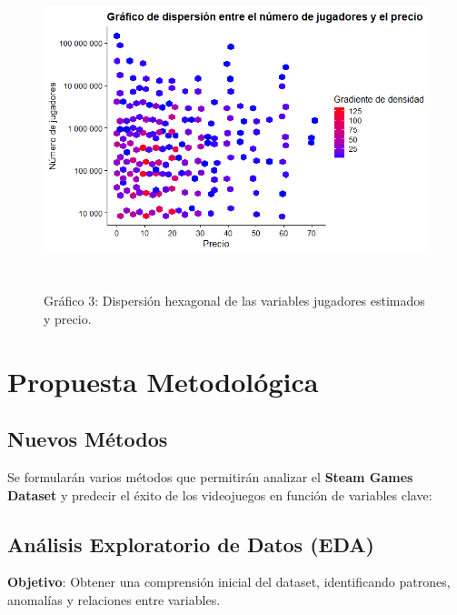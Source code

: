 \documentclass[
  letterpaper,
  DIV=11,
  numbers=noendperiod]{scrreprt}
\begin{document}
\begin{figure}

{\centering \includegraphics[width=138mm,height=92mm]{./imagenes/Rplot02.png}

}

\caption{Gráfico 3: Dispersión hexagonal de las variables jugadores
estimados y precio.}

\end{figure}

\hypertarget{propuesta-metodoluxf3gica}{%
\section{Propuesta Metodológica}\label{propuesta-metodoluxf3gica}}

\hypertarget{nuevos-muxe9todos}{%
\subsection{Nuevos Métodos}\label{nuevos-muxe9todos}}

Se formularán varios métodos que permitirán analizar el \textbf{Steam
Games Dataset} y predecir el éxito de los videojuegos en función de
variables clave:

\hypertarget{anuxe1lisis-exploratorio-de-datos-eda}{%
\subsection{Análisis Exploratorio de Datos
(EDA)}\label{anuxe1lisis-exploratorio-de-datos-eda}}

\textbf{Objetivo}: Obtener una comprensión inicial del dataset,
identificando patrones, anomalías y relaciones entre variables.
\end{document}
